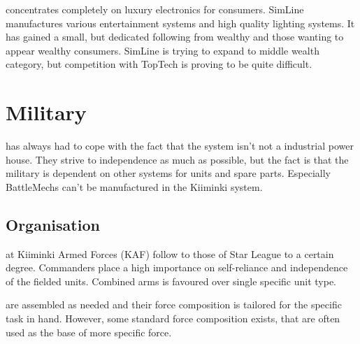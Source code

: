 \documentclass{tufte-book}
\begin{document}
 concentrates completely on luxury electronics
for consumers. SimLine manufactures various entertainment systems and high
quality lighting systems. It has gained a small, but dedicated following from
wealthy and those wanting to appear wealthy consumers. SimLine is trying to
expand to middle wealth category, but competition with TopTech is proving to
be quite difficult.


\chapter{Military}
\label{ch:military}

 has always had to cope with the fact
that the system isn't not a industrial power house. They strive to
independence as much as possible, but the fact is that the military
is dependent on other systems for units and spare parts. Especially
BattleMechs can't be manufactured in the Kiiminki system.

\section{Organisation}
\label{sc:organisation}

 at Kiiminki Armed Forces (KAF) follow
to those of Star League to a certain degree. Commanders place a high
importance on self-reliance and independence of the fielded units.
Combined arms is favoured over single specific unit type.

 are assembled as needed and their force
composition is tailored for the specific task in hand. However, some
standard force composition exists, that are often used as the base of
more specific force.
\end{document}
